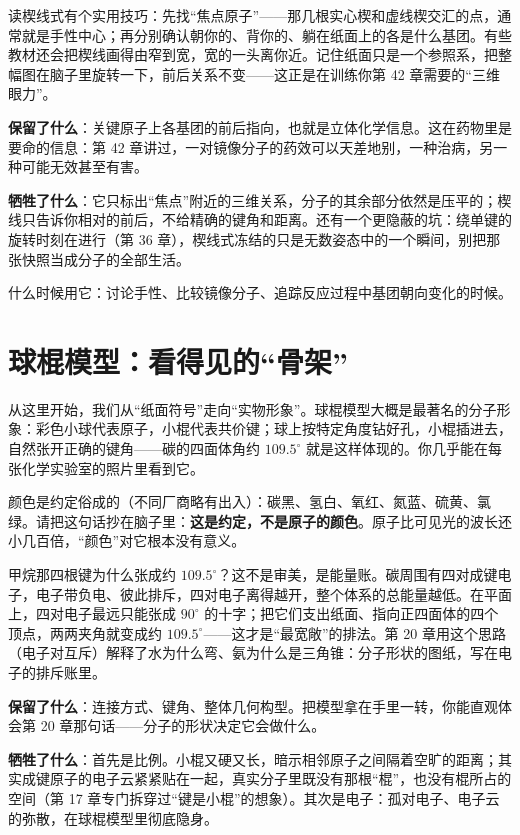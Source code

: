 读楔线式有个实用技巧：先找“焦点原子”——那几根实心楔和虚线楔交汇的点，通常就是手性中心；再分别确认朝你的、背你的、躺在纸面上的各是什么基团。有些教材还会把楔线画得由窄到宽，宽的一头离你近。记住纸面只是一个参照系，把整幅图在脑子里旋转一下，前后关系不变——这正是在训练你第 42 章需要的“三维眼力”。

\textbf{保留了什么}：关键原子上各基团的前后指向，也就是立体化学信息。这在药物里是要命的信息：第 42 章讲过，一对镜像分子的药效可以天差地别，一种治病，另一种可能无效甚至有害。

\textbf{牺牲了什么}：它只标出“焦点”附近的三维关系，分子的其余部分依然是压平的；楔线只告诉你相对的前后，不给精确的键角和距离。还有一个更隐蔽的坑：绕单键的旋转时刻在进行（第 36 章），楔线式冻结的只是无数姿态中的一个瞬间，别把那张快照当成分子的全部生活。

什么时候用它：讨论手性、比较镜像分子、追踪反应过程中基团朝向变化的时候。

\section{球棍模型：看得见的“骨架”}

从这里开始，我们从“纸面符号”走向“实物形象”。球棍模型大概是最著名的分子形象：彩色小球代表原子，小棍代表共价键；球上按特定角度钻好孔，小棍插进去，自然张开正确的键角——碳的四面体角约 $109.5^{\circ}$ 就是这样体现的。你几乎能在每张化学实验室的照片里看到它。

颜色是约定俗成的（不同厂商略有出入）：碳黑、氢白、氧红、氮蓝、硫黄、氯绿。请把这句话抄在脑子里：\textbf{这是约定，不是原子的颜色}。原子比可见光的波长还小几百倍，“颜色”对它根本没有意义。

\begin{qiaoliang}
甲烷那四根键为什么张成约 $109.5^{\circ}$？这不是审美，是能量账。碳周围有四对成键电子，电子带负电、彼此排斥，四对电子离得越开，整个体系的总能量越低。在平面上，四对电子最远只能张成 $90^{\circ}$ 的十字；把它们支出纸面、指向正四面体的四个顶点，两两夹角就变成约 $109.5^{\circ}$——这才是“最宽敞”的排法。第 20 章用这个思路（电子对互斥）解释了水为什么弯、氨为什么是三角锥：分子形状的图纸，写在电子的排斥账里。
\end{qiaoliang}

\textbf{保留了什么}：连接方式、键角、整体几何构型。把模型拿在手里一转，你能直观体会第 20 章那句话——分子的形状决定它会做什么。

\textbf{牺牲了什么}：首先是比例。小棍又硬又长，暗示相邻原子之间隔着空旷的距离；其实成键原子的电子云紧紧贴在一起，真实分子里既没有那根“棍”，也没有棍所占的空间（第 17 章专门拆穿过“键是小棍”的想象）。其次是电子：孤对电子、电子云的弥散，在球棍模型里彻底隐身。

